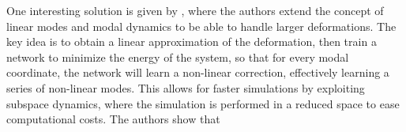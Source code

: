 One interesting solution is given by \cite{Wang_Du_Coros_Thomaszewski_2024}, where the authors extend the concept of linear modes and modal dynamics \cite{Pentland_Williams_1989} to be able to handle larger deformations. The key idea is to obtain a linear approximation of the deformation, then train a network to minimize the energy of the system, so that for every modal coordinate, the network will learn a non-linear correction, effectively learning a series of non-linear modes. This allows for faster simulations by exploiting subspace dynamics, where the simulation is performed in a reduced space to ease computational costs. The authors show that 


